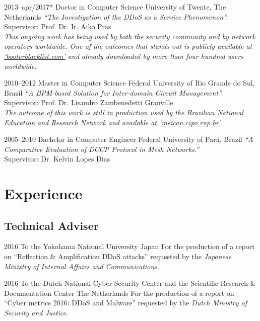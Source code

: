 \documentclass[print]{styles/friggeri-cv-mac} %
\begin{document}
\begin{entrylist}

\entry
{2013--apr/2017*}
{Doctor {\normalfont in Computer Science}}
{University of Twente, The Netherlands}
{\emph{``The Investigation of the DDoS as a Service Phenomenon''.} \\
Supervisor: Prof. Dr. Ir. Aiko Pras\\	
\textit{This ongoing work has being used by both the security community and by
network operators worldwide. One of the outcomes that stands out is publicly available at \href{http://booterblacklist.com}{`booterblacklist.com'} and  already
downloaded by more than four hundred users worldwide.}}

\entry
{2010--2012}
{Master {\normalfont in Computer Science}}
{Federal University of Rio Grande do Sul, Brazil}
{\emph{``A BPM-based Solution for Inter-domain Circuit Management''.}\\
Supervisor: Prof. Dr. Lisandro Zambenedetti Granville\\
\textit{The outcome of this work is still in production used by the Brazilian
National Education and Research Network and available at
\href{http://meican.cipo.rnp.br/}{`meican.cipo.rnp.br'}.}}

\entry
{2005--2010}
{Bachelor {\normalfont in Computer Engineer}}
{Federal University of Par\'a, Brazil}
{\emph{``A Comparative Evaluation of DCCP Protocol in Mesh Networks.''} \\ 
Supervisor: Dr. Kelvin Lopes Dias
}

\end{entrylist}

\section{Experience}\vspace{-5pt}
\subsection{Technical Adviser}\vspace{-5pt}
\begin{entrylist}
\entry
{2016}
{To the Yokohama National University}
{Japan}
{For the production of a report on ``Reflection \& Amplification DDoS attacks''
requested by the \emph{Japanese Ministry of Internal Affairs and
Communications}.}

\entry
{2016}
{To the Dutch National Cyber Security Center and the Scientific Research \& Documentation Center}
{The Netherlands}
{For the production of a report on ``Cyber metrics 2016: DDoS and Malware''
requested by the \emph{Dutch Ministry of Security and Justice}.} \end{entrylist}
\end{document}
